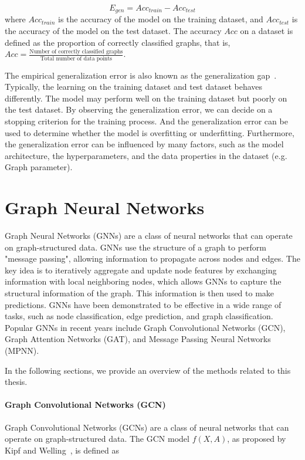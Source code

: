 $$
    E_{gen} = {Acc_{train}} - {Acc_{test}}
$$
where $Acc_{train}$ is the accuracy of the model on the training dataset, and $Acc_{test}$ is the accuracy of the model on the test dataset. The accuracy $Acc$ on a dataset is defined as the proportion of correctly classified graphs, that is, $Acc = \frac{\textrm{Number of correctly classified graphs}}{\textrm{Total number of data points}}$.

The empirical generalization error is also known as the generalization gap~\cite{goodfellow2016deep}. Typically, the learning on the training dataset and test dataset behaves differently. The model may perform well on the training dataset but poorly on the test dataset. By observing the generalization error, we can decide on a stopping criterion for the training process. And the generalization error can be used to determine whether the model is overfitting or underfitting. Furthermore, the generalization error can be influenced by many factors, such as the model architecture, the hyperparameters, and the data properties in the dataset (e.g. Graph parameter). 

\section{Graph Neural Networks}
Graph Neural Networks (GNNs) are a class of neural networks that can operate on graph-structured data. GNNs use the structure of a graph to perform "message passing", allowing information to propagate across nodes and edges. The key idea is to iteratively aggregate and update node features by exchanging information with local neighboring nodes, which allows GNNs to capture the structural information of the graph. This information is then used to make predictions. GNNs have been demonstrated to be effective in a wide range of tasks, such as node classification, edge prediction, and graph classification. Popular GNNs in recent years include Graph Convolutional Networks (GCN), Graph Attention Networks (GAT), and Message Passing Neural Networks (MPNN).

In the following sections, we provide an overview of the methods related to this thesis.

\paragraph{Graph Convolutional Networks (GCN)}

Graph Convolutional Networks (GCNs) are a class of neural networks that can operate on graph-structured data. The GCN model $f(X, A)$, as proposed by Kipf and Welling~\cite{kipf2016semi}, is defined as

